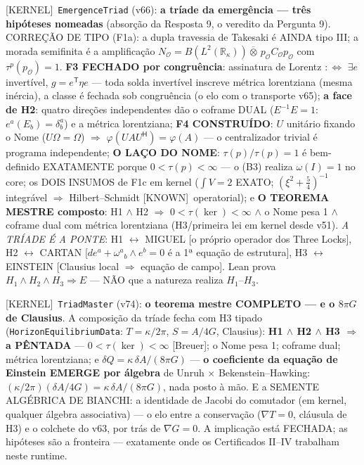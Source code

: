 \documentclass[11pt]{article}
\providecommand{\kernelmk}[1]{\textsf{[KERNEL]}~\texttt{#1}}\providecommand{\knownmk}[1]{\textsf{[KNOWN]}~{#1}}\providecommand{\statusmk}[1]{\textsf{[#1]}}
\theoremstyle{definition}\newtheorem{deriv}{Derivação}
\begin{document}
\kernelmk{EmergenceTriad} (v66): \textbf{a tríade da emergência --- três hipóteses nomeadas} (absorção da Resposta 9, o veredito da Pergunta 9). CORREÇÃO DE TIPO (F1a): a dupla travessia de Takesaki é AINDA tipo III; a morada semifinita é a amplificação $N_{\mathcal O}=B(L^2(\mathbb R_\kappa))\overline\otimes\,p_{\mathcal O}C_{\mathcal O}p_{\mathcal O}$ com $\tau^p(p_{\mathcal O})=1$. \textbf{F3 FECHADO por congruência}: assinatura de Lorentz $:\Leftrightarrow$ $\exists e$ invertível, $g=e^\mathsf{T}\eta e$ --- toda solda invertível inscreve métrica lorentziana (mesma inércia), a classe é fechada sob congruência (o elo com o transporte v65); \textbf{a face de H2}: quatro direções independentes dão o coframe DUAL ($E^{-1}E=1$: $e^a(E_b)=\delta^a_b$) e a métrica lorentziana; \textbf{F4 CONSTRUÍDO}: $U$ unitário fixando o Nome ($U\Omega=\Omega$) $\Rightarrow$ $\varphi(UAU^\mathsf{H})=\varphi(A)$ --- o centralizador trivial é programa independente; \textbf{O LAÇO DO NOME}: $\tau(p)/\tau(p)=1$ é bem-definido EXATAMENTE porque $0<\tau(p)<\infty$ --- o (B3) realiza $\omega(I)=1$ no core; os DOIS INSUMOS de F1c em kernel ($\int V=2$ EXATO; $(\xi^2+\tfrac54)^{-1}$ integrável $\Rightarrow$ Hilbert--Schmidt \knownmk{operatorial}); e \textbf{O TEOREMA MESTRE composto}: H1 $\wedge$ H2 $\Rightarrow$ $0<\tau(\ker)<\infty$ $\wedge$ o Nome pesa 1 $\wedge$ coframe dual com métrica lorentziana (H3/primeira lei em kernel desde v51). \emph{A TRÍADE É A PONTE}: H1 $\leftrightarrow$ MIGUEL [o próprio operador dos Three Locks], H2 $\leftrightarrow$ CARTAN [$de^a+\omega^a{}_b\wedge e^b=0$ é a 1ª equação de estrutura], H3 $\leftrightarrow$ EINSTEIN [Clausius local $\Rightarrow$ equação de campo]. Lean prova $H_1\wedge H_2\wedge H_3\Rightarrow E$ --- NÃO que a natureza realiza $H_1$--$H_3$.

\kernelmk{TriadMaster} (v74): \textbf{o teorema mestre COMPLETO --- e o $8\pi G$ de Clausius}. A composição da tríade fecha com H3 tipado (\texttt{HorizonEquilibriumData}: $T=\kappa/2\pi$, $S=A/4G$, Clausius): \textbf{H1 $\wedge$ H2 $\wedge$ H3 $\Rightarrow$ a PÊNTADA} --- $0<\tau(\ker)<\infty$ [Breuer]; o Nome pesa 1; coframe dual; métrica lorentziana; e $\delta Q=\kappa\,\delta A/(8\pi G)$ --- \textbf{o coeficiente da equação de Einstein EMERGE por álgebra} de Unruh $\times$ Bekenstein--Hawking: $(\kappa/2\pi)(\delta A/4G)=\kappa\,\delta A/(8\pi G)$, nada posto à mão. E a SEMENTE ALGÉBRICA DE BIANCHI: a identidade de Jacobi do comutador (em kernel, qualquer álgebra associativa) --- o elo entre a conservação ($\nabla T=0$, cláusula de H3) e o colchete do v63, por trás de $\nabla G=0$. A implicação está FECHADA; as hipóteses são a fronteira --- exatamente onde os Certificados II--IV trabalham neste runtime.
\end{document}

